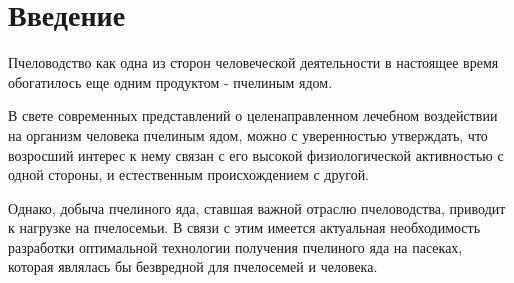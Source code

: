 \section{Введение}

Пчеловодство как одна из сторон человеческой деятельности в настоящее время обогатилось еще одним продуктом - пчелиным ядом. 

В свете современных представлений о целенаправленном лечебном воздействии на организм человека пчелиным ядом, можно с уверенностью утверждать, что возросший интерес к нему связан с его высокой физиологической активностью с одной стороны, и естественным происхождением с другой. 

Однако, добыча пчелиного яда, ставшая важной отраслю пчеловодства, приводит к нагрузке на пчелосемьи. В связи с этим имеется актуальная необходимость разработки оптимальной технологии получения пчелиного яда на пасеках, которая являлась бы безвредной для пчелосемей и человека.